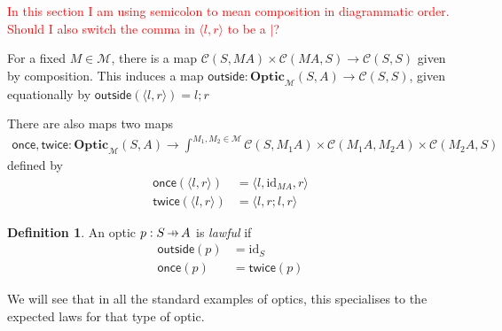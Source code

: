 \documentclass[11pt,a4paper]{article}
\theoremstyle{plain}
\theoremstyle{definition}
\newtheorem{definition}[theorem]{Definition}
\newcommand{\C}{\mathscr{C}}
\newcommand{\M}{\mathscr{M}}
\newcommand{\Optic}{\mathbf{Optic}}
\newcommand{\id}{\mathrm{id}}
\newcommand{\outside}{\mathsf{outside}}
\newcommand{\once}{\mathsf{once}}
\newcommand{\twice}{\mathsf{twice}}
\newcommand{\hto}{\ensuremath{\,\mathaccent\shortmid\rightarrow\,}}
\newcommand{\todo}[1]{\textcolor{red}{\small #1}}
\begin{document}
\todo{In this section I am using semicolon to mean composition in diagrammatic order. Should I also switch the comma in $\langle l, r \rangle$ to be a $\mid$?}

For a fixed $M \in \M$, there is a map $\C(S, M A) \times \C(M A, S) \to \C(S, S)$ given by composition. This induces a map $\outside : \Optic_\M(S, A) \to \C(S, S)$, given equationally by $\outside(\langle l, r \rangle) = l ; r$

There are also maps two maps 
\begin{align*}
\once, \twice : \Optic_\M(S, A) \to \int^{M_1, M_2 \in \M} \C(S, M_1 A) \times \C(M_1 A, M_2 A) \times \C(M_2 A, S)
\end{align*}
defined by 
\begin{align*}
\once(\langle l, r \rangle) &= \langle l, \id_{MA}, r \rangle \\
\twice(\langle l, r \rangle) &= \langle l, r;l, r \rangle
\end{align*}

\begin{definition}
An optic $p : S \hto A$ is \emph{lawful} if 
\begin{align*}
\outside(p) &= \id_S \\
\once(p) &= \twice(p)
\end{align*}
\end{definition}

We will see that in all the standard examples of optics, this specialises to the expected laws for that type of optic.
\end{document}
